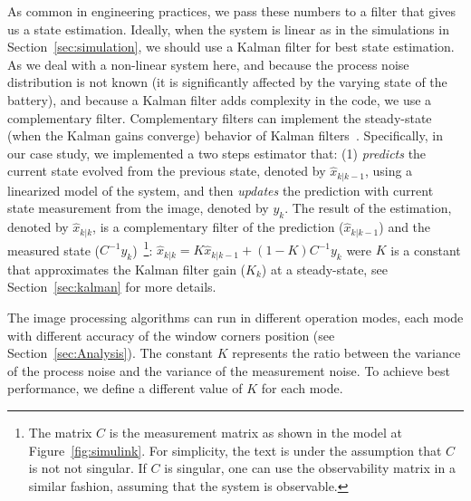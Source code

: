 \documentclass[ twoside, 12pt ]{article}
\begin{document}
As common in engineering practices, we pass these numbers to a filter that gives us a state estimation. 
Ideally, when the system is linear as in the simulations in Section~\ref{sec:simulation}, we should use a Kalman filter for best state estimation. As we deal with a non-linear system here, and because the process noise distribution is not known (it is significantly affected by the varying state of the battery), and because a Kalman filter adds complexity in the code, we use a complementary filter.
Complementary filters can implement the steady-state (when the Kalman gains converge) behavior of Kalman filters~\cite{complementaryVSKalman}.
Specifically, in our case study, we implemented a two steps estimator that: (1) \textit{predicts} the current state evolved from the previous state, denoted by $\hat{x}_{k|k-1}$, using a linearized model of the system, and then \textit{updates} the prediction with current state measurement from the image, denoted by $y_k$.
The result of the estimation, denoted by $\hat{x}_{k|k}$, is a complementary filter of the prediction ($\hat{x}_{k|k-1}$) and the measured state ($C^{-1}y_k$)~\footnote{The matrix $C$ is the measurement matrix as shown in the model at Figure~\ref{fig:simulink}. For simplicity, the text is under the assumption that $C$ is not not singular. If $C$ is singular, one can use the observability matrix in a similar fashion, assuming that the system is observable.}:
$ \hat{x}_{k|k} = K \hat{x}_{k|k-1} + (1-K) C^{-1}y_k $ were $K$ is a constant that approximates the Kalman filter gain ($K_k$) at a steady-state, see Section~\ref{sec:kalman} for more details.

The image processing algorithms can run in different operation modes, each mode with different accuracy of the window corners position (see Section~\ref{sec:Analysis}).
The constant $K$ represents the ratio between the variance of the process noise and the variance of the measurement noise. To achieve best performance, we define a different value of $K$ for each mode.
\end{document}
